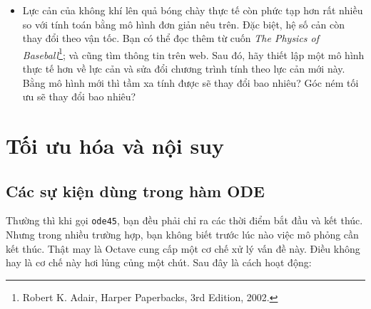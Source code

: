 \documentclass[12pt]{book}
\begin{document}
\begin{ex}
\begin{itemize}
\item Lực cản của không khí lên quả bóng chày thực tế còn phức tạp
hơn rất nhiều so với tính toán bằng mô hình đơn giản nêu trên. Đặc biệt,
hệ số cản còn thay đổi theo vận tốc. Bạn có thể đọc thêm từ cuốn
{\em The Physics of Baseball}\footnote{Robert K. Adair, Harper Paperbacks, 3rd
Edition, 2002.}; và cũng tìm thông tin trên web. Sau đó, hãy thiết lập
một mô hình thực tế hơn về lực cản và sửa đổi chương trình tính theo
lực cản mới này. Bằng mô hình mới thì tầm xa tính được sẽ thay đổi
bao nhiêu? Góc ném tối ưu sẽ thay đổi bao nhiêu?

\end{itemize}

\end{ex}


\chapter{Tối ưu hóa và nội suy}

\section{Các sự kiện dùng trong hàm ODE}
\label{events}

Thường thì khi gọi {\tt ode45}, bạn đều phải chỉ ra các thời điểm bắt đầu
và kết thúc. Nhưng trong nhiều trường hợp, bạn không biết trước
lúc nào việc mô phỏng cần kết thúc. Thật may là Octave cung cấp
một cơ chế xử lý vấn đề này. Điều không hay là cơ chế này hơi lủng củng
một chút. Sau đây là cách hoạt động:
\end{document}

